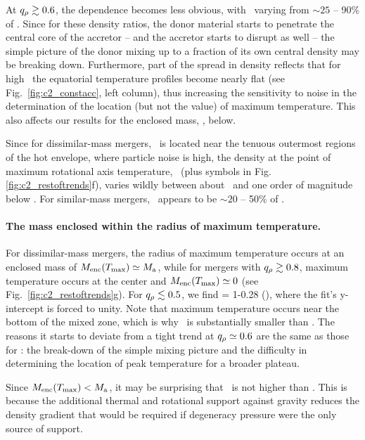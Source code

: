 At $\qrho\gtrsim0.6$, the dependence becomes less obvious, with \rhoTmax\ varying from $\sim\!25$ -- 90\% of \rhocd.  Since for these density ratios,  the donor material starts to penetrate the central core of the accretor -- and the accretor starts to disrupt as well -- the simple picture of the donor mixing up to a fraction of its own central density may be breaking down.  Furthermore, part of the spread in density reflects that for high \qrho\ the equatorial temperature profiles become nearly flat (see Fig.~\ref{fig:c2_constacc}, left column), thus increasing the sensitivity to noise in the determination of the location (but not the value) of maximum temperature.  This also affects our results for the enclosed mass, \MencTmax, below.

Since for dissimilar-mass mergers, \zTmax\ is located near the tenuous outermost regions of the hot envelope, where particle noise is high, the density at the point of maximum rotational axis temperature, \zrhoTmax\ (plus symbols in Fig. \ref{fig:c2_restoftrends}f), varies wildly between about \rhoTmax\ and one order of magnitude below \rhoTmax.  For similar-mass mergers, \zrhoTmax\ appears to be $\sim\!20$ -- 50\% of {\rhoTmax}.

\paragraph{The mass enclosed within the radius of maximum temperature.}  For dissimilar-mass mergers, the radius of maximum temperature occurs at an enclosed mass of $\MencTmax\simeq\Ma$, while for mergers with $\qrho\gtrsim0.8$, maximum temperature occurs at the center and $\MencTmax\simeq0$ (see Fig.~\ref{fig:c2_restoftrends}g).  For $\qrho\lesssim0.5$, we find
\eqbegin
\frac{\MencTmax}{\Ma} = 1-0.28\qrho
\qquad(),
\eqend
where the fit's y-intercept is forced to unity.  Note that maximum temperature occurs near the bottom of the mixed zone, which is why \MencTmax\ is substantially smaller than \MMfifty.  The reasons it starts to deviate from a tight trend at $\qrho\simeq0.6$ are the same as those for \rhoTmax: the break-down of the simple mixing picture and the difficulty in determining the location of peak temperature for a broader plateau.

Since $\MencTmax<\Ma$, it may be surprising that \rhoTmax\ is not higher than \rhocd.  This is because the additional thermal and rotational support against gravity reduces the density gradient that would be required if degeneracy pressure were the only source of support.

